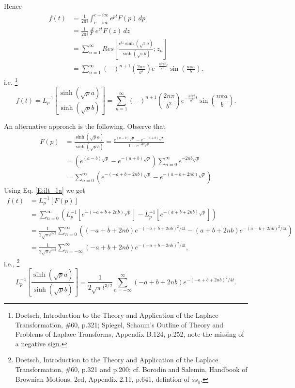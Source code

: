 Hence
\begin{align*}
	f(t)  
	&= \frac{1}{2\pi i}   
      \int_{c-i\infty}^{c+i\infty} e^{p t} F(p)\, dp  \\
	&= \frac{1}{2\pi i} \oint e^{z t} F(z)\, dz \\
	&= \sum_{n=1}^{\infty} 
	  Res\left[ \frac{e^{tz} \sinh (\sqrt{z} a)}{\sinh (\sqrt{z} b)}; z_n
		\right] \\
	&= \sum_{n=1}^{\infty} 
	  (-)^{n+1} \left( \frac{2n\pi}{b^2} \right) e^{-\frac{n^2\pi^2}{b^2} t} 
	  \sin(\frac{n\pi a}{b}).
\end{align*}
i.e.
\footnote{Doetsch, Introduction to the Theory and Application of the Laplace
Transformation, \#60, p.321; Spiegel, Schaum's Outline of Theory and Problems of
Laplace Transforms, Appendix B.124, p.252, note the missing of a negative sign.}
\begin{equation} \label{E:ilt_sinh_1A}
  f(t)
	= L_p^{-1}\left[ \frac{\sinh (\sqrt{p} a)}{\sinh (\sqrt{p} b)} \right]
	= \sum_{n=1}^{\infty} 
	  (-)^{n+1} \left( \frac{2n\pi}{b^2} \right) e^{-\frac{n^2\pi^2}{b^2} t} 
	  \sin(\frac{n\pi a}{b}).
\end{equation}

An alternative approach is the following. Observe that
\begin{align*}
	F(p) 
	&= \frac{\sinh (\sqrt{p} a)}{\sinh (\sqrt{p} b)}  
	 = \frac{e^{(a-b)\sqrt{p}} - e^{-(a+b)\sqrt{p}}}{1- e^{-2b\sqrt{p}}} \\
	&= (e^{(a-b)\sqrt{p}} - e^{-(a+b)\sqrt{p}}) 
	   \sum_{n=0}^{\infty} e^{-2nb\sqrt{p}} \\
  &= \sum_{n=0}^{\infty} 
		 \left( e^{-(-a+b+2nb)\sqrt{p}} - e^{-(a+b+2nb)\sqrt{p}} \right)
\end{align*}
Using Eq. \ref{E:ilt_1a} we get
\begin{align*}
	f(t) 
	&= L_p^{-1} [F(p)]  \\
  &= \sum_{n=0}^{\infty} 
	   \left( L_p^{-1}[ e^{-(-a+b+2nb)\sqrt{p}} ] 
	        - L_p^{-1}[ e^{-( a+b+2nb)\sqrt{p}} ] \right) \\
	&= \frac{1}{2\sqrt{\pi} t^{{3/2}} }
 		 \sum_{n=0}^{\infty} 
		 \left(
			 (-a+b+2nb) e^{-(-a+b+2nb)^2/4t} - (a+b+2nb) e^{-(a+b+2nb)^2/4t}
		 \right)  \\
  &= \frac{1}{2\sqrt{\pi} t^{{3/2}} }
 		 \sum_{n=-\infty}^{\infty}  (-a+b+2nb) e^{-(-a+b+2nb)^2/4t},
\end{align*}
i.e.,
\footnote{Doetsch, Introduction to the Theory and Application of the Laplace
Transformation, \#60, p.321 and p.200; cf. Borodin and Salemin, Handbook of 
Brownian Motions, 2ed, Appendix 2.11, p.641, defintion of $ss_y$.}
\begin{equation} \label{E:ilt_sinh_1B}
	L_p^{-1}\left[ \frac{\sinh (\sqrt{p} a)}{\sinh (\sqrt{p} b)} \right]
  = \frac{1}{2\sqrt{\pi} t^{{3/2}} }
 		\sum_{n=-\infty}^{\infty}  (-a+b+2nb) e^{-(-a+b+2nb)^2/4t}.
\end{equation}

